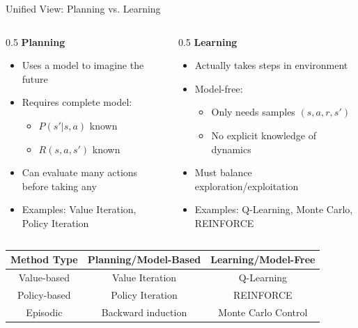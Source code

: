 \documentclass[10pt]{beamer}
\begin{document}
\begin{frame}{Unified View: Planning vs. Learning}
    \begin{columns}
        \begin{column}{0.5\textwidth}
            \textbf{Planning}
            \begin{itemize}
                \item Uses a model to imagine the future
                \item Requires complete model:
                \begin{itemize}
                    \item $P(s'|s,a)$ known
                    \item $R(s,a,s')$ known
                \end{itemize}
                \item Can evaluate many actions before taking any
                \item Examples: Value Iteration, Policy Iteration
            \end{itemize}
        \end{column}
        
        \begin{column}{0.5\textwidth}
            \textbf{Learning}
            \begin{itemize}
                \item Actually takes steps in environment
                \item Model-free:
                \begin{itemize}
                    \item Only needs samples $(s,a,r,s')$
                    \item No explicit knowledge of dynamics
                \end{itemize}
                \item Must balance exploration/exploitation
                \item Examples: Q-Learning, Monte Carlo, REINFORCE
            \end{itemize}
        \end{column}
    \end{columns}
    
    \begin{center}
        \begin{tabular}{|c|c|c|}
            \hline
            \textbf{Method Type} & \textbf{Planning/Model-Based} & \textbf{Learning/Model-Free} \\
            \hline
            Value-based & Value Iteration & Q-Learning \\
            \hline
            Policy-based & Policy Iteration & REINFORCE \\
            \hline
            Episodic & Backward induction & Monte Carlo Control \\
            \hline
        \end{tabular}
    \end{center}
\end{frame}
\end{document}
